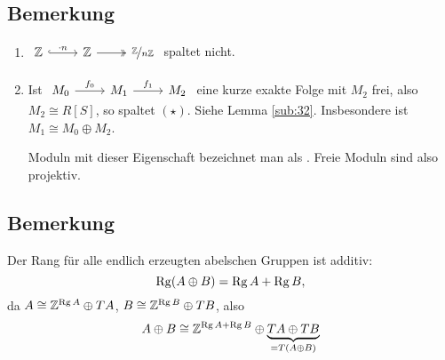 \subsection[Bemerkung: Existenz einer Spaltung, wenn $M_2$ frei ist]{Bemerkung} %
\label{sub:46}
\begin{enumerate}[1)]
	\item $\begin{tikzcd}
		\mathds{Z} \rar[hook,"\cdot n"] & \mathds{Z} \rar[two heads] &  \nicefrac{\mathds{Z}}{n \mathds{Z}}
	\end{tikzcd}$
	spaltet nicht.
	\item Ist $\begin{tikzcd}
		M_0 \rar["f_0"] & M_1 \rar["f_1"] & M_2
	\end{tikzcd}$
	eine kurze exakte Folge mit $M_2$ frei, also $M_2 \cong R[S]$, so spaltet $(\star)$.
	Siehe Lemma \ref{sub:32}. Insbesondere ist $M_1 \cong M_0 \oplus M_2$.
	
	Moduln mit dieser Eigenschaft bezeichnet man als . Freie Moduln sind also projektiv.
\end{enumerate}

\subsection[Bemerkung: Der Rang ist additiv]{Bemerkung} %
\label{sub:47}
Der Rang für alle endlich erzeugten abelschen Gruppen ist additiv:
\[
	\operatorname{Rg}(A \oplus B) =\operatorname{Rg} A + \operatorname{Rg} B,
\]
da $A \cong \mathbb{Z}^{\operatorname{Rg} A} \oplus T A$, $B \cong \mathbb{Z}^{\operatorname{Rg} B} \oplus TB$, also 
\[
	A \oplus B \cong \mathbb{Z}^{\operatorname{Rg} A + \operatorname{Rg} B} \oplus \underbrace{T A \oplus T B}_{=T(A \oplus B)}
\]

